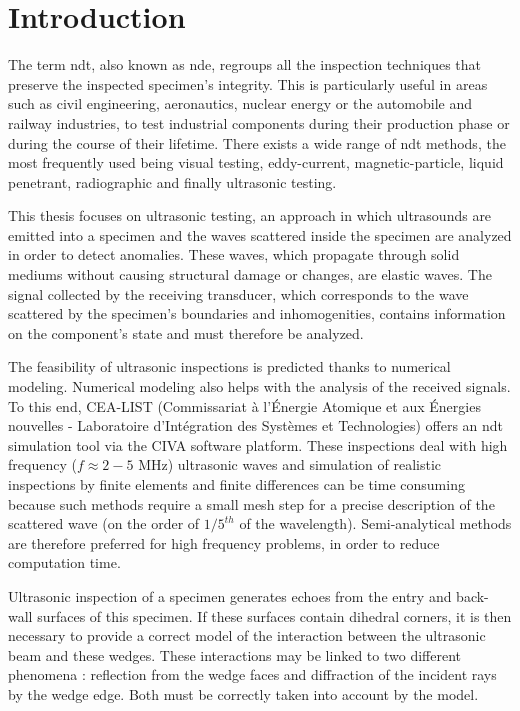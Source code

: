 \chapter*{Introduction}

The term \acrfull{ndt}, also known as \acrfull{nde}, regroups all the inspection techniques that preserve the inspected specimen's integrity. This is particularly useful in areas such as civil engineering, aeronautics, nuclear energy or the automobile and railway industries, to test industrial components during their production phase or during the course of their lifetime. There exists a wide range of \acrshort{ndt} methods, the most frequently used being visual testing, eddy-current, magnetic-particle, liquid penetrant, radiographic and finally ultrasonic testing. 

This thesis focuses on ultrasonic testing, an approach in which ultrasounds are emitted into a specimen and the waves scattered inside the specimen are analyzed in order to detect anomalies. These waves, which propagate through solid mediums without causing structural damage or changes, are elastic waves. The signal collected by the receiving transducer, which corresponds to the wave scattered by the specimen's boundaries and inhomogenities, contains information on the component's state and must therefore be analyzed.

The feasibility of ultrasonic inspections is predicted thanks to numerical modeling. Numerical modeling also helps with the analysis of the received signals. To this end, CEA-LIST (Commissariat à l’Énergie Atomique et aux Énergies nouvelles - Laboratoire d’Intégration des Systèmes et Technologies) offers an \acrshort{ndt} simulation tool via the CIVA software platform. These inspections deal with high frequency ($f \approx 2-5$ MHz) ultrasonic waves and simulation of realistic inspections by finite elements and finite differences can be time consuming because such methods require a small mesh step for a precise description of the scattered wave (on the order of $1/5^{th}$ of the wavelength). Semi-analytical methods are therefore preferred for high frequency problems, in order to reduce computation time. %

Ultrasonic inspection of a specimen generates echoes from the entry and back-wall surfaces of this specimen. If these surfaces contain dihedral corners, it is then necessary to provide a correct model of the interaction between the ultrasonic beam and these wedges. These interactions may be linked to two different phenomena : reflection from the wedge faces and diffraction of the incident rays by the wedge edge. Both must be correctly taken into account by the model.

